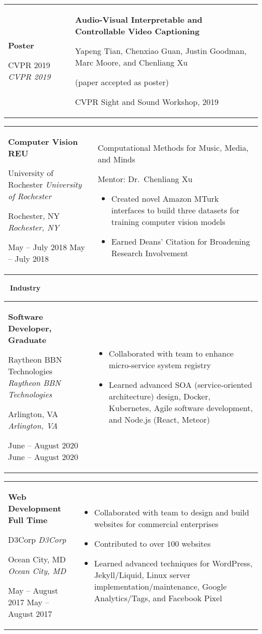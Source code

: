 \documentclass[11pt,letterpaper]{article}
\newcommand{\sect}[1]{
\begin{center}
	\noindent\xrfill[0.7ex]{0.5pt} \mbox{ } {\Large \bf #1} \mbox{ } \xrfill[0.7ex]{0.5pt}
\end{center}
}
\newcommand{\entry}[5]{
	\noindent
	\begin{tabular}{p{2in} p{\dimexpr \linewidth-2\tabcolsep-3in}} %
		\noindent \textbf{#1}
		
		\ifx #2  \else \noindent \textit{#2} \fi
		
		\ifx #3  \else \noindent \textit{#3} \fi
		
		\ifx #4  \else \noindent #4 \fi
		&
		#5
	\end{tabular}
	\vspace{0.5cm}
}
\begin{document}
	
	\entry{Poster}{CVPR 2019}{}{}{
		\textbf{Audio-Visual Interpretable and Controllable Video Captioning}
		
		Yapeng Tian, Chenxiao Guan, Justin Goodman, Marc Moore, and Chenliang Xu
		
		(paper accepted as poster)
		
		CVPR Sight and Sound Workshop, 2019
	}
	
	\entry{Computer Vision REU}{University of Rochester}{Rochester, NY}{May -- July 2018}{
		Computational Methods for Music, Media, and Minds
		
		Mentor: Dr.\ Chenliang Xu
		
		\begin{itemize}[nosep, wide]
			\item Created novel Amazon MTurk interfaces to build three datasets for training computer vision models
			\item Earned Deans' Citation for Broadening Research Involvement
		\end{itemize}
	}
	
	\pagebreak
	\sect{Industry}
	
	\entry{Software Developer, Graduate}{Raytheon BBN Technologies}{Arlington, VA}{June -- August 2020}{
		\vspace{-5mm}
		\begin{itemize}[itemsep=0pt, wide]
			\item Collaborated with team to enhance micro-service system registry
			\item Learned advanced SOA (service-oriented architecture) design, Docker, Kubernetes, Agile software development, and Node.js (React, Meteor)
		\end{itemize}
	}
	
	\entry{Web Development Full Time}{D3Corp}{Ocean City, MD}{May -- August 2017}{
		\vspace{-5mm}
		\begin{itemize}[itemsep=0pt, wide]
			\item Collaborated with team to design and build websites for commercial enterprises
			\item Contributed to over 100 websites
			\item Learned advanced techniques for WordPress, Jekyll/Liquid, Linux server implementation/maintenance, Google Analytics/Tags, and Facebook Pixel
		\end{itemize}
	}
	
\end{document}
